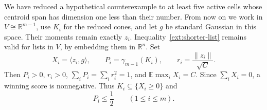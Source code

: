 We have reduced a hypothetical counterexample to at least five active
cells whose centroid span has dimension one less than their number.
From now on we work in $V\cong\mathbb R^{m-1}$, use $K_i$ for the reduced
cones, and let $g$ be standard Gaussian in this space. Their moments
remain exactly $z_i$. Inequality~\eqref{ext:shorter-list} remains valid
for lists in $V$, by embedding them in $\mathbb R^n$. Set
\begin{equation}\label{ext:notation}
 X_i=\langle z_i,g\rangle,
 \qquad P_i=\gamma_{m-1}(K_i),
 \qquad r_i=\frac{\|z_i\|}{\sqrt C}.
\end{equation}
Then $P_i>0$, $r_i>0$, $\sum_iP_i=\sum_i r_i^2=1$, and
$\mathbb E\max_iX_i=C$. Since $\sum_iX_i=0$, a winning score is
nonnegative. Thus $K_i\subseteq\{X_i\ge0\}$ and
\begin{equation}\label{ext:half-probability}
 P_i\le\frac12\qquad(1\le i\le m).
\end{equation}
